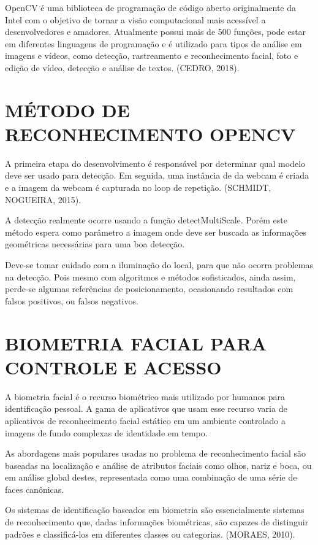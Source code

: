 OpenCV é uma biblioteca de programação de código aberto originalmente da Intel com 
o objetivo de tornar a visão computacional mais acessível a desenvolvedores e amadores. 
Atualmente possui mais de 500 funções, pode estar em diferentes linguagens de programação e é 
utilizado para tipos de análise em imagens e vídeos, como detecção, rastreamento e 
reconhecimento facial, foto e edição de vídeo, detecção e análise de textos. (CEDRO, 2018).

\section{MÉTODO DE RECONHECIMENTO OPENCV}\label{sec:formatacaoTexto}

A primeira etapa do desenvolvimento é responsável por determinar qual modelo deve 
ser usado para detecção. Em seguida, uma instância de da webcam é criada e a imagem da 
webcam é capturada no loop de repetição. \cite{silverthorn2017}  (SCHMIDT, NOGUEIRA, 2015).

A detecção realmente ocorre usando a função detectMultiScale. Porém este método 
espera como parâmetro a imagem onde deve ser buscada as informações geométricas 
necessárias para uma boa detecção.

Deve-se tomar cuidado com a iluminação do local, para que não ocorra problemas na 
detecção. Pois mesmo com algoritmos e métodos sofisticados, ainda assim, perde-se algumas 
referências de posicionamento, ocasionando resultados com falsos positivos, ou falsos 
negativos.

\section{BIOMETRIA FACIAL PARA CONTROLE E ACESSO}\label{sec:formatacaoTexto}

A biometria facial é o recurso biométrico mais utilizado por humanos para identificação 
pessoal. A gama de aplicativos que usam esse recurso varia de aplicativos de reconhecimento 
facial estático em um ambiente controlado a imagens de fundo complexas de identidade em 
tempo.

As abordagens mais populares usadas no problema de reconhecimento facial são 
baseadas na localização e análise de atributos faciais como olhos, nariz e boca, ou em análise 
global destes, representada como uma combinação de uma série de faces canônicas.

Os sistemas de identificação baseados em biometria são essencialmente sistemas de 
reconhecimento que, dadas informações biométricas, são capazes de distinguir padrões e 
classificá-los em diferentes classes ou categorias.  (MORAES, 2010).

